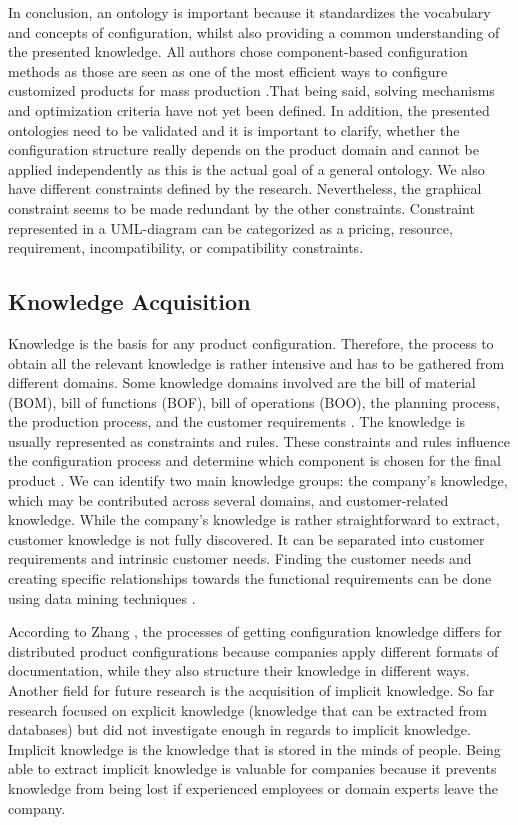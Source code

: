 In conclusion, an ontology is important because it standardizes the vocabulary and concepts of configuration, whilst also providing a common understanding of the presented knowledge. All authors chose component-based configuration methods as those are seen as one of the most efficient ways to configure customized products for mass production \cite{shwalife06a}.That being said, solving mechanisms and optimization criteria have not yet been defined. In addition, the presented ontologies need to be validated and it is important to clarify, whether the configuration structure really depends on the product domain and cannot be applied independently as this is the actual goal of a general ontology. We also have different constraints defined by the research. Nevertheless, the graphical constraint seems to be made redundant by the other constraints. Constraint represented in a UML-diagram can be categorized as a pricing, resource, requirement, incompatibility, or compatibility constraints.

\subsection{Knowledge Acquisition}

Knowledge is the basis for any product configuration. Therefore, the process to obtain all the relevant knowledge is rather intensive and has to be gathered from different domains. Some knowledge domains involved are the bill of material (BOM), bill of functions (BOF), bill of operations (BOO), the planning process, the production process, and the customer requirements \cite{zhvaal13a}. The knowledge is usually represented as constraints and rules. These constraints and rules influence the configuration process and determine which component is chosen for the final product \cite{fefrjastza03a}. We can identify two main knowledge groups: the company’s knowledge, which may be contributed across several domains, and customer-related knowledge. While the company’s knowledge is rather straightforward to extract, customer knowledge is not fully discovered. It can be separated into customer requirements and intrinsic customer needs. Finding the customer needs and creating specific relationships towards the functional requirements can be done using data mining techniques \cite{shwalife06a}.  \newline

According to Zhang \cite{zhang14a}, the processes of getting configuration knowledge differs for distributed product configurations because companies apply different formats of documentation, while they also structure their knowledge in different ways. Another field for future research is the acquisition of implicit knowledge. So far research focused on explicit knowledge (knowledge that can be extracted from databases) but did not investigate enough in regards to implicit knowledge. Implicit knowledge is the knowledge that is stored in the minds of people. Being able to extract implicit knowledge is valuable for companies because it prevents knowledge from being lost if experienced employees or domain experts leave the company.

